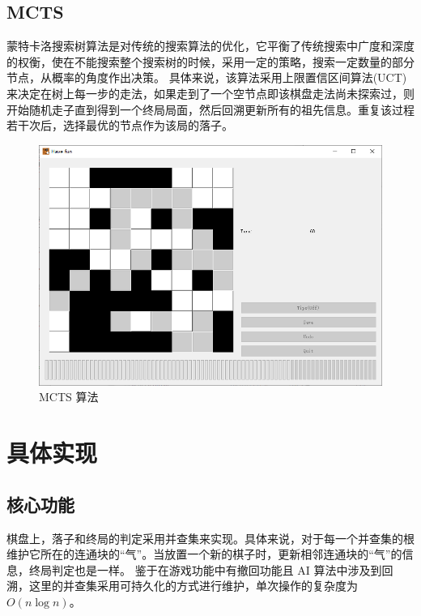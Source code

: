 \documentclass[UTF-8]{ctexart}
\begin{document}
		\subsection{MCTS}
			蒙特卡洛搜索树算法是对传统的搜索算法的优化，它平衡了传统搜索中广度和深度的权衡，使在不能搜索整个搜索树的时候，采用一定的策略，搜索一定数量的部分节点，从概率的角度作出决策。
			具体来说，该算法采用上限置信区间算法(UCT)来决定在树上每一步的走法，如果走到了一个空节点即该棋盘走法尚未探索过，则开始随机走子直到得到一个终局局面，然后回溯更新所有的祖先信息。重复该过程若干次后，选择最优的节点作为该局的落子。
			\begin{figure}[H]
				\centering
				\includegraphics[width=13cm]{./file/mcts.png}
				\caption{MCTS 算法}
			\end{figure}
	\section{具体实现}
		\subsection{核心功能}
			棋盘上，落子和终局的判定采用并查集来实现。具体来说，对于每一个并查集的根维护它所在的连通块的“气”。当放置一个新的棋子时，更新相邻连通块的“气”的信息，终局判定也是一样。
			鉴于在游戏功能中有撤回功能且 AI 算法中涉及到回溯，这里的并查集采用可持久化的方式进行维护，单次操作的复杂度为 $O(n\log n)$。
\end{document}
